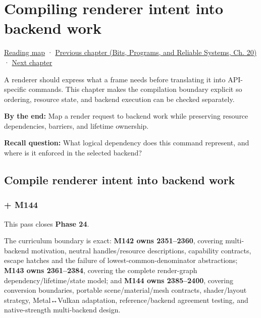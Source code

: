 \chapter{Compiling renderer intent into backend work}\label{06-engine-ii-ch043-compiling-renderer-intent-into-backend-work}\hypertarget{06-engine-ii-ch043}{}\label{stagechapter:06-engine-ii-ch043}

\hypertarget{06-engine-ii-ch043-compiling-renderer-intent-into-backend-work}{}

\hyperref[volume-reading-map]{Reading map} · \href{../01-Bits-Programs-and-Reliable-Systems/main.pdf\#nameddest=06-engine-ii-ch042-from-cartridge-bytes-to-a-reproducible-machine}{Previous chapter (Bits, Programs, and Reliable Systems, Ch. 20)} · \hyperref[06-engine-ii-ch044-cross-backend-conversion-and-agreement]{Next chapter}

A renderer should express what a frame needs before translating it into API-specific commands. This chapter makes the compilation boundary explicit so ordering, resource state, and backend execution can be checked separately.

\textbf{By the end:} Map a render request to backend work while preserving resource dependencies, barriers, and lifetime ownership.

\textbf{Recall question:} What logical dependency does this command represent, and where is it enforced in the selected backend?

\section{Compile renderer intent into backend work}\label{06-engine-ii-ch043-compile-renderer-intent-into-backend-work}

\hypertarget{06-engine-ii-ch043-compile-renderer-intent-into-backend-work}{}

\subsection{+ M144}\label{06-engine-ii-ch043-m144}

\hypertarget{06-engine-ii-ch043-m144}{}

This pass closes \textbf{Phase 24}.

The curriculum boundary is exact: \textbf{M142 owns 2351--2360}, covering multi-backend motivation, neutral handles/resource descriptions, capability contracts, escape hatches and the failure of lowest-common-denominator abstractions; \textbf{M143 owns 2361--2384}, covering the complete render-graph dependency/lifetime/state model; and \textbf{M144 owns 2385--2400}, covering conversion boundaries, portable scene/material/mesh contracts, shader/layout strategy, Metal↔Vulkan adaptation, reference/backend agreement testing, and native-strength multi-backend design.

